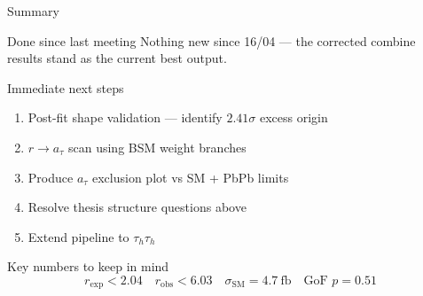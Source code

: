 \begin{frame}{Summary}
\protect{}\label{summary}
\begin{block}{Done since last meeting}
\protect{}\label{done-since-last-meeting}
Nothing new since 16/04 --- the corrected combine results stand as the
current best output.
\end{block}

\begin{block}{Immediate next steps}
\protect{}\label{immediate-next-steps}
\begin{enumerate}
\tightlist
\item
  Post-fit shape validation --- identify \(2.41\sigma\) excess origin
\item
  \(r \to a_\tau\) scan using BSM weight branches
\item
  Produce \(a_\tau\) exclusion plot vs SM + PbPb limits
\item
  Resolve thesis structure questions above
\item
  Extend pipeline to \(\tau_h\tau_h\)
\end{enumerate}
\end{block}

\begin{block}{Key numbers to keep in mind}
\protect{}\label{key-numbers-to-keep-in-mind}
\[r_\text{exp} < 2.04 \quad r_\text{obs} < 6.03 \quad \sigma_\text{SM} = 4.7\ \text{fb} \quad \text{GoF } p = 0.51\]
\end{block}
\end{frame}

